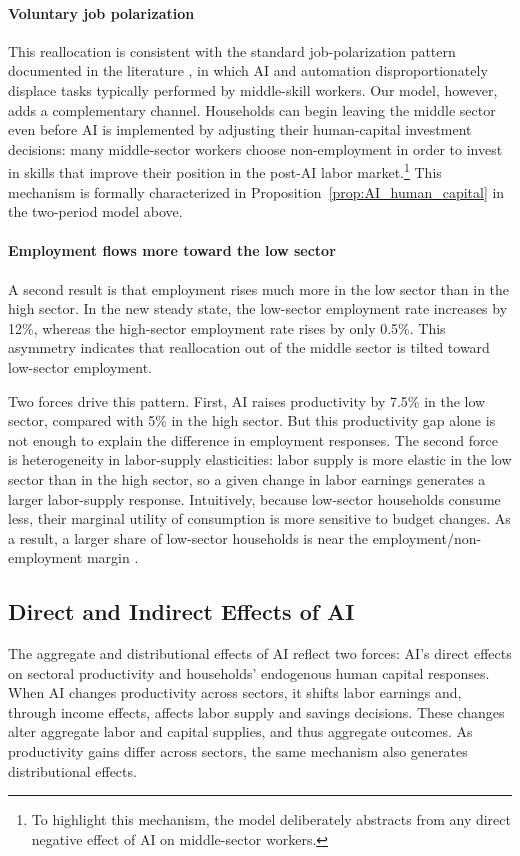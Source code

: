 \documentclass[12pt,english]{article}
\numberwithin{equation}{section}
\begin{document}
\paragraph{Voluntary job polarization}
This reallocation is consistent with the standard job-polarization pattern documented in the literature \parencites{Goos2014}, in which AI and automation disproportionately displace tasks typically performed by middle-skill workers. Our model, however, adds a complementary channel. Households can begin leaving the middle sector even before AI is implemented by adjusting their human-capital investment decisions: many middle-sector workers choose non-employment in order to invest in skills that improve their position in the post-AI labor market.\footnote{To highlight this mechanism, the model deliberately abstracts from any direct negative effect of AI on middle-sector workers.} This mechanism is formally characterized in Proposition~\ref{prop:AI_human_capital} in the two-period model above.

\paragraph{Employment flows more toward the low sector}
A second result is that employment rises much more in the low sector than in the high sector. In the new steady state, the low-sector employment rate increases by 12\%, whereas the high-sector employment rate rises by only 0.5\%. This asymmetry indicates that reallocation out of the middle sector is tilted toward low-sector employment.

Two forces drive this pattern. First, AI raises productivity by 7.5\% in the low sector, compared with 5\% in the high sector. But this productivity gap alone is not enough to explain the difference in employment responses. The second force is heterogeneity in labor-supply elasticities: labor supply is more elastic in the low sector than in the high sector, so a given change in labor earnings generates a larger labor-supply response. Intuitively, because low-sector households consume less, their marginal utility of consumption is more sensitive to budget changes. As a result, a larger share of low-sector households is near the employment/non-employment margin \citep{Chang2006}.



\subsection{Direct and Indirect Effects of AI}
The aggregate and distributional effects of AI reflect two forces: AI’s direct effects on sectoral productivity and households’ endogenous human capital responses. When AI changes productivity across sectors, it shifts labor earnings and, through income effects, affects labor supply and savings decisions. These changes alter aggregate labor and capital supplies, and thus aggregate outcomes. As productivity gains differ across sectors, the same mechanism also generates distributional effects.
\end{document}
